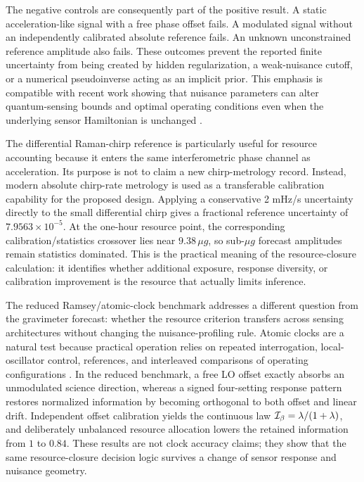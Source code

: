 The negative controls are consequently part of the positive result. A static acceleration-like signal with a free phase offset fails. A modulated signal without an independently calibrated absolute reference fails. An unknown unconstrained reference amplitude also fails. These outcomes prevent the reported finite uncertainty from being created by hidden regularization, a weak-nuisance cutoff, or a numerical pseudoinverse acting as an implicit prior. This emphasis is compatible with recent work showing that nuisance parameters can alter quantum-sensing bounds and optimal operating conditions even when the underlying sensor Hamiltonian is unchanged \cite{Wani2026}.

The differential Raman-chirp reference is particularly useful for resource accounting because it enters the same interferometric phase channel as acceleration. Its purpose is not to claim a new chirp-metrology record. Instead, modern absolute chirp-rate metrology \cite{Zhang2025} is used as a transferable calibration capability for the proposed design. Applying a conservative 2 mHz/s uncertainty directly to the small differential chirp gives a fractional reference uncertainty of $7.9563\times10^{-5}$. At the one-hour resource point, the corresponding calibration/statistics crossover lies near $9.38\,\mu g$, so sub-$\mu g$ forecast amplitudes remain statistics dominated. This is the practical meaning of the resource-closure calculation: it identifies whether additional exposure, response diversity, or calibration improvement is the resource that actually limits inference.

The reduced Ramsey/atomic-clock benchmark addresses a different question from the gravimeter forecast: whether the resource criterion transfers across sensing architectures without changing the nuisance-profiling rule. Atomic clocks are a natural test because practical operation relies on repeated interrogation, local-oscillator control, references, and interleaved comparisons of operating configurations \cite{Ludlow2015,Lindvall2025}. In the reduced benchmark, a free LO offset exactly absorbs an unmodulated science direction, whereas a signed four-setting response pattern restores normalized information by becoming orthogonal to both offset and linear drift. Independent offset calibration yields the continuous law $\mathcal I_{\beta}=\lambda/(1+\lambda)$, and deliberately unbalanced resource allocation lowers the retained information from $1$ to $0.84$. These results are not clock accuracy claims; they show that the same resource-closure decision logic survives a change of sensor response and nuisance geometry.

